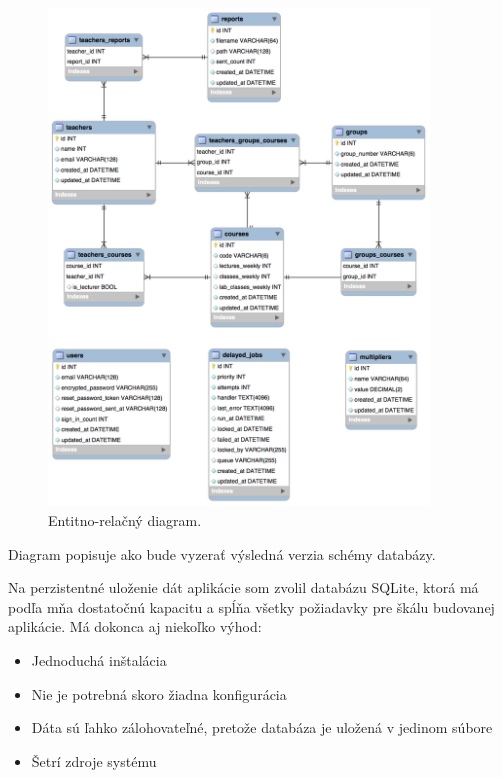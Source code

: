 \begin{figure}[!htb]
  \centering
  \hspace*{-0.5cm}
  \includegraphics[width=0.9\textwidth]{content/images/db}
  \caption{Entitno-relačný diagram.}
\end{figure}

\clearpage
Diagram popisuje ako bude vyzerať výsledná verzia schémy databázy.

Na perzistentné uloženie dát aplikácie som zvolil databázu SQLite, ktorá má podľa mňa dostatočnú kapacitu a spĺňa všetky požiadavky pre škálu budovanej aplikácie. Má dokonca aj niekoľko výhod:

\begin{itemize}
    \item Jednoduchá inštalácia
    \item Nie je potrebná skoro žiadna konfigurácia
    \item Dáta sú ľahko zálohovateľné, pretože databáza je uložená v jedinom súbore
    \item Šetrí zdroje systému
\end{itemize}

